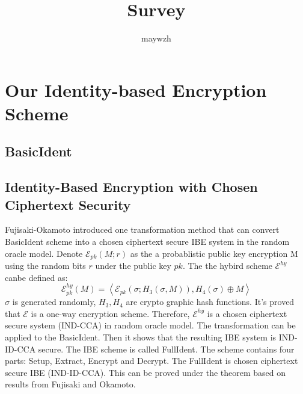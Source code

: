 \documentclass[11pt,en]{elegantpaper}
\title{Survey}
\author{maywzh}
\institute{CCNU-UOW Joint Institude}
\date{}
\begin{document}
\maketitle

\begin{abstract}

\end{abstract}


\section{Our Identity-based Encryption Scheme}

\subsection{BasicIdent}
\subsection{Identity-Based Encryption with Chosen Ciphertext Security}
Fujisaki-Okamoto introduced one transformation method that can convert BasicIdent scheme into a chosen ciphertext secure IBE system in the random oracle model. Denote $\mathcal{E}_{pk}(M;r)$ as the a probablistic public key encryption M using the random bits $r$ under the public key $pk$. The the hybird scheme $\mathcal{E}^{hy}$ canbe defined as:
$$
\mathcal{E}_{p k}^{h y}(M)=\left\langle\mathcal{E}_{p k}\left(\sigma ; H_{3}(\sigma, M)\right), H_{4}(\sigma) \oplus M\right\rangle
$$
$\sigma$ is generated randomly, $H_3,H_4$ are crypto graphic hash functions. It's proved that $\mathcal{E}$ is a one-way encryption scheme. Therefore, $\mathcal{E}^{hy}$ is a chosen ciphertext secure system (IND-CCA) in random oracle model. The transformation can be applied to the BasicIdent. Then it shows that the resulting IBE system is IND-ID-CCA secure. The IBE scheme is called FullIdent. The scheme contains four parts: Setup, Extract, Encrypt and Decrypt. The FullIdent is chosen ciphertext secure IBE (IND-ID-CCA). This can be proved under the theorem based on results from Fujisaki and Okamoto. 
\end{document}
